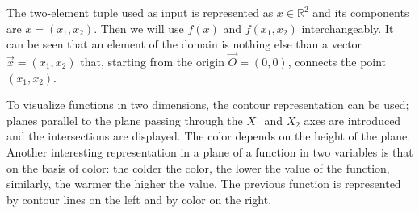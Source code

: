 The two-element tuple used as input is represented as \( x \in \mathbb{R}^2 \) and its components are \( x = (x_1, x_2) \). Then we will use \( f(x) \) and \(f(x_1, x_2) \) interchangeably. It can be seen that an element of the domain is nothing else than a vector \( \vec{x} = (x_1, x_2) \) that, starting from the origin \( \vec{O} = (0,0) \), connects the point \( (x_1, x_2) \).

\begin{center}
    \footnotesize
\end{center}  

To visualize functions in two dimensions, the contour representation can be used; planes parallel to the plane passing through the \( X_1 \) and \( X_2 \) axes are introduced and the intersections are displayed. The color depends on the height of the plane. Another interesting representation in a plane of a function in two variables is that on the basis of color: the colder the color, the lower the value of the function, similarly, the warmer the higher the value. The previous function is represented by contour lines on the left and by color on the right.

